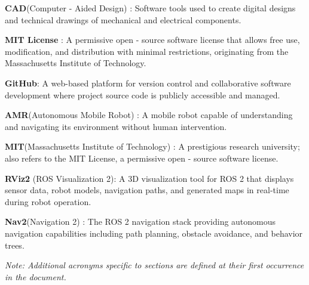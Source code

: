 \begin {
  enumerate
}
    \item \label{
acr:
  CAD
}
\textbf{CAD}(Computer - Aided Design)
    : Software tools used to create digital designs
      and technical drawings of mechanical and
      electrical components.

    \item \label {
acr:
  MITLicense
}
\textbf{MIT License} : A permissive open -
                       source software license that allows free use,
    modification, and distribution with minimal restrictions,
    originating from the Massachusetts Institute of Technology.

    \item \label {
acr:
  GitHub
} \textbf{GitHub}: A web-based platform for version control and collaborative software development where project source code is publicly accessible and managed.

    \item \label{
acr:
  AMR
}
\textbf{AMR}(Autonomous Mobile Robot)
    : A mobile robot capable of understanding
      and navigating its environment without human intervention.

    \item \label {
acr:
  MIT
}
\textbf{MIT}(Massachusetts Institute of Technology)
    : A prestigious research university;
also refers to the MIT License, a permissive open - source software license.

    \item \label {
acr:
  RViz2
} \textbf{RViz2} (ROS Visualization 2): A 3D visualization tool for ROS 2 that displays sensor data, robot models, navigation paths, and generated maps in real-time during robot operation.

    \item \label{
acr:
  Nav2
}
\textbf{Nav2}(Navigation 2)
    : The ROS 2 navigation stack providing autonomous navigation
      capabilities including path planning,
      obstacle avoidance, and behavior trees.

\end {
  enumerate
}

\vspace { 0.3in }

\noindent \textit {
Note:
  Additional acronyms specific to sections are defined at their first occurrence
      in the document.
}
